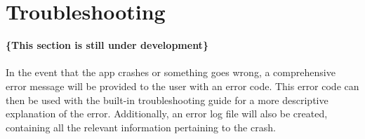 \documentclass[hidelinks,a4paper,12pt]{article}
\begin{document}
\section{Troubleshooting}
	{\bfseries\{This section is still under development\}}\\ \\
	In the event that the app crashes or something goes wrong, a comprehensive error message will be provided to the user with an error code. This error code can then be used with the built-in troubleshooting guide for a more descriptive explanation of the error. Additionally, an error log file will also be created, containing all the relevant information pertaining to the crash.
		
\end{document}
